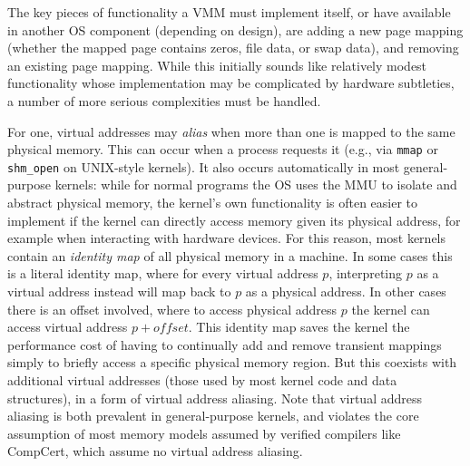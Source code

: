 The key pieces of functionality a VMM must implement itself, or have available in another OS component (depending on 
design), are
adding a new page mapping (whether the mapped page contains zeros, file data, or swap data), and removing an existing 
page mapping.
While this initially sounds like relatively modest functionality whose implementation may be complicated by hardware 
subtleties, a number of more serious complexities must be handled.

For one, virtual addresses may \emph{alias} when more than one is mapped to the same physical memory. 
This can occur when a process requests it (e.g., via \texttt{mmap} or \texttt{shm\_open} on UNIX-style kernels). 
It also occurs automatically in most general-purpose kernels: while for normal programs the OS uses the MMU to isolate 
and abstract physical memory, the kernel's own functionality is often easier to implement if the kernel can directly 
access memory given its physical address, for example when interacting with hardware devices. For this reason, most 
kernels contain an \emph{identity map} of all physical memory in a machine. 
In some cases this is a literal identity map, 
where for every virtual address $p$, interpreting $p$ as a virtual address instead will map back to $p$ as a physical 
address. In other cases there is an offset involved, where to access physical address $p$ the kernel can access virtual
 address $p+\mathit{offset}$. This identity map saves the kernel the performance cost of having to continually add and
 remove transient mappings simply to briefly access a specific physical memory region. But this coexists with additional
 virtual addresses (those used by most kernel code and data structures), in a form of virtual address aliasing. Note 
that virtual address aliasing is both prevalent in general-purpose kernels, and violates the core assumption of most 
memory models assumed by verified compilers like CompCert, which assume no virtual address aliasing.

